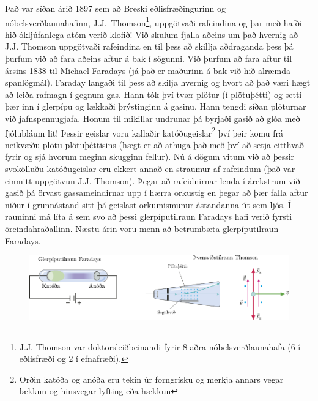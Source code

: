 Það var síðan árið 1897 sem að Breski eðlisfræðingurinn og nóbelsverðlaunahafinn, J.J.~Thomson\footnote{J.J. Thomson var doktorsleiðbeinandi fyrir 8 aðra nóbelsverðlaunahafa (6 í eðlisfræði og 2 í efnafræði).}, uppgötvaði rafeindina og þar með hafði hið ókljúfanlega atóm verið klofið!  Við skulum fjalla aðeins um það hvernig að J.J. Thomson uppgötvaði rafeindina en til þess að skillja aðdraganda þess þá þurfum við að fara aðeins aftur á bak í sögunni. Við þurfum að fara aftur til ársins 1838 til Michael Faradays (já það er maðurinn á bak við hið alræmda spanlögmál). Faraday langaði til þess að skilja hvernig og hvort að það væri hægt að leiða rafmagn í gegnum gas. Hann tók því tvær plötur (í plötuþétti) og setti þær inn í glerpípu og lækkaði þrýstinginn á gasinu. Hann tengdi síðan plöturnar við jafnspennugjafa. Honum til mikillar undrunar þá byrjaði gasið að glóa með fjólubláum lit! Þessir geislar voru kallaðir katóðugeislar\footnote{Orðin katóða og anóða eru tekin úr forngrísku og merkja annars vegar lækkun og hinsvegar lyfting eða hækkun} því þeir komu frá neikvæðu plötu plötuþéttisins (hægt er að athuga það með því að setja eitthvað fyrir og sjá hvorum meginn skugginn fellur). Nú á dögum vitum við að þessir svokölluðu katóðugeislar eru ekkert annað en straumur af rafeindum (það var einmitt uppgötvun J.J. Thomson). Þegar að rafeidnirnar lenda í árekstrum við gasið þá örvast gassameindirnar upp í hærra orkustig en þegar að þær falla aftur niður í grunnástand sitt þá geislast orkumismunur ástandanna út sem ljós. Í rauninni má líta á sem svo að þessi glerpíputilraun Faradays hafi verið fyrsti öreindahraðallinn. Næstu árin voru menn að betrumbæta glerpíputilraun Faradays.

\begin{figure}[H]
    \centering
    \includegraphics[]{figures/jjthomson.pdf}
\end{figure}

